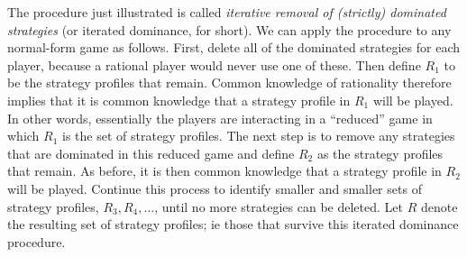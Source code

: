 The procedure just illustrated is called \emph{iterative removal of (strictly) dominated strategies} (or iterated dominance, for short). We can apply the procedure to any normal-form game as follows. First, delete all of the dominated strategies for each player, because a rational player would never use one of these. Then define $R_1$ to be the strategy profiles that remain. Common knowledge of rationality therefore implies that it is common knowledge that a strategy profile in $R_1$ will be played. In other words, essentially the players are interacting in a “reduced” game in which $R_1$ is the set of strategy profiles. The next step is to remove any strategies that are dominated in this reduced game and define $R_2$ as the strategy profiles that remain. As before, it is then common knowledge that a strategy profile in $R_2$ will be played. Continue this process to identify smaller and smaller sets of strategy profiles, $R_3, R_4, \ldots$, until no more strategies can be deleted. Let $R$ denote the resulting set of strategy profiles; ie those that survive this iterated dominance procedure.




